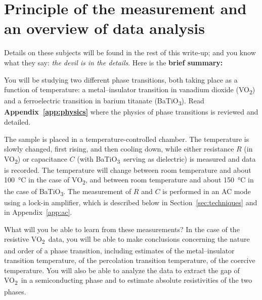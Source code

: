 \documentclass[11pt,a4paper]{article}
\newcommand{\VOtwo}{VO\textsubscript{2}}
\newcommand{\BTO}{BaTiO\textsubscript{3}}
\begin{document}
\section{Principle of the measurement and an overview of data analysis}

Details on these subjects will be found in the rest of this write-up; and you
know what they say: \textit{the devil is in the details}. Here is the \textbf{brief summary:}

You will be studying two different phase transitions, both taking place as a
function of temperature: a metal--insulator transition in vanadium dioxide
(\VOtwo) and a ferroelectric transition in barium titanate (\BTO). Read
\textbf{Appendix~\ref{app:physics}} where the physics of phase transitions is reviewed
and detailed.

The sample is placed in a temperature-controlled chamber. The temperature is
slowly changed, first rising, and then cooling down, while either resistance
$R$ (in \VOtwo) or capacitance $C$ (with \BTO\ serving as dielectric) is
measured and data is recorded. The temperature will change between room
temperature and about \SI{100}{\degreeCelsius} in the case of \VOtwo, and
between room temperature and about \SI{150}{\degreeCelsius} in the case of
\BTO. The measurement of $R$ and $C$ is performed in an AC mode using a lock-in
amplifier, which is described below in Section~\ref{sec:techniques} and in
Appendix~\ref{app:ac}.

What will you be able to learn from these measurements? In the case of the
resistive \VOtwo\ data, you will be able to make conclusions concerning the
nature and order of a phase transition, including estimates of the
metal--insulator transition temperature, of the percolation transition
temperature, of the coercive temperature. You will also be able to analyze the
data to extract the gap of \VOtwo\ in a semiconducting phase and to
estimate absolute resistivities of the two phases.
\end{document}
